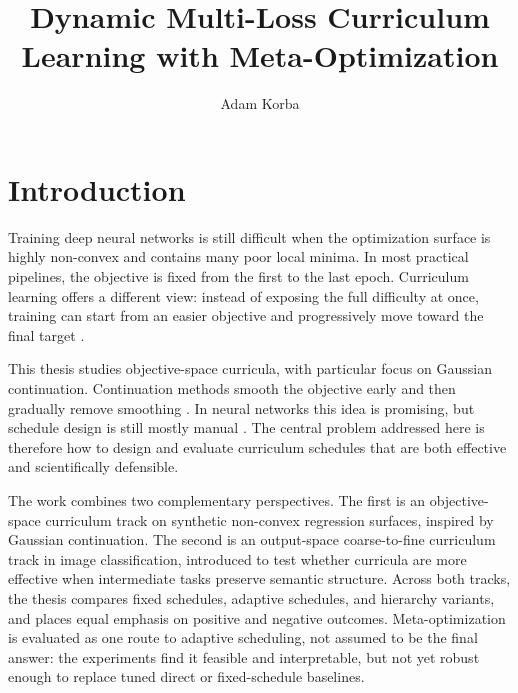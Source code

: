 \documentclass[english,master,a4paper,oneside]{ppfcmthesis}
\author{%
   Adam Korba \album{151962}}
\title{Dynamic Multi-Loss Curriculum Learning with Meta-Optimization}
\begin{document}
\frontmatter\pagestyle{empty}%
\maketitle\cleardoublepage%


\pagestyle{ppfcmthesis}%
\tableofcontents*
\cleardoublepage %


\mainmatter%
\chapter{Introduction}
\label{chap:introduction}

Training deep neural networks is still difficult when the optimization surface
is highly non-convex and contains many poor local minima. In most practical
pipelines, the objective is fixed from the first to the last epoch. Curriculum
learning offers a different view: instead of exposing the full difficulty at
once, training can start from an easier objective and progressively move toward
the final target \citep{elman1993learning,bengio2009curriculum}.

This thesis studies objective-space curricula, with particular focus on
Gaussian continuation. Continuation methods smooth the objective early and then
gradually remove smoothing \citep{allgower1990numerical,mobahi2015theoretical}.
In neural networks this idea is promising, but schedule design is still mostly
manual \citep{wang2021survey}. The central problem addressed here is therefore
how to design and evaluate curriculum schedules that are both effective and
scientifically defensible.

The work combines two complementary perspectives. The first is an
objective-space curriculum track on synthetic non-convex regression surfaces,
inspired by Gaussian continuation. The second is an output-space coarse-to-fine
curriculum track in image classification, introduced to test whether curricula
are more effective when intermediate tasks preserve semantic structure. Across
both tracks, the thesis compares fixed schedules, adaptive schedules, and
hierarchy variants, and places equal emphasis on positive and negative outcomes.
Meta-optimization is evaluated as one route to adaptive scheduling, not assumed
to be the final answer: the experiments find it feasible and interpretable, but
not yet robust enough to replace tuned direct or fixed-schedule baselines.
\end{document}
